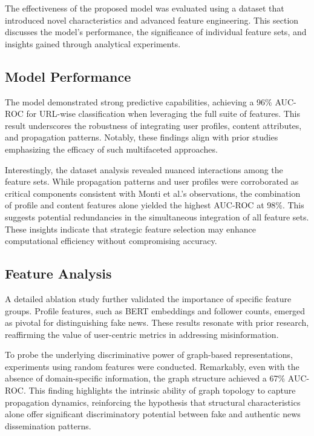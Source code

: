 \documentclass[sigconf,nonacm]{acmart}
\begin{document}
The effectiveness of the proposed model was evaluated using a dataset that introduced novel characteristics and advanced feature engineering. This section discusses the model's performance, the significance of individual feature sets, and insights gained through analytical experiments.

\subsection{Model Performance}

The model demonstrated strong predictive capabilities, achieving a 96\% AUC-ROC for URL-wise classification when leveraging the full suite of features. This result underscores the robustness of integrating user profiles, content attributes, and propagation patterns. Notably, these findings align with prior studies emphasizing the efficacy of such multifaceted approaches.

Interestingly, the dataset analysis revealed nuanced interactions among the feature sets. While propagation patterns and user profiles were corroborated as critical components consistent with Monti et al.'s observations, the combination of profile and content features alone yielded the highest AUC-ROC at 98\%. This suggests potential redundancies in the simultaneous integration of all feature sets. These insights indicate that strategic feature selection may enhance computational efficiency without compromising accuracy.

\subsection{Feature Analysis}

A detailed ablation study further validated the importance of specific feature groups. Profile features, such as BERT embeddings and follower counts, emerged as pivotal for distinguishing fake news. These results resonate with prior research, reaffirming the value of user-centric metrics in addressing misinformation.

To probe the underlying discriminative power of graph-based representations, experiments using random features were conducted. Remarkably, even with the absence of domain-specific information, the graph structure achieved a 67\% AUC-ROC. This finding highlights the intrinsic ability of graph topology to capture propagation dynamics, reinforcing the hypothesis that structural characteristics alone offer significant discriminatory potential between fake and authentic news dissemination patterns.
\end{document}
